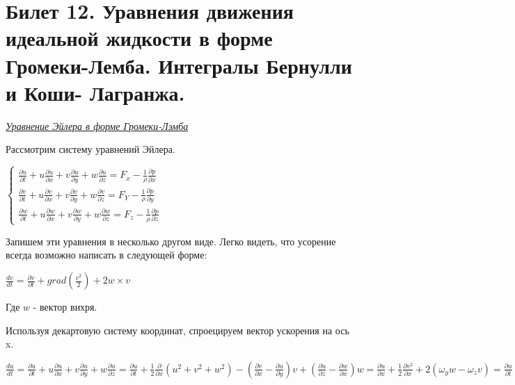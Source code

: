 \newpage
\section{Билет 12. Уравнения движения идеальной жидкости в форме Громеки-Лемба. Интегралы Бернулли и Коши- Лагранжа.}

\begin{center}
	\textit{\underline{Уравнение Эйлера в форме Громеки-Лэмба}}
\end{center}
Рассмотрим систему уравнений Эйлера.
\begin{center}
	$\begin{cases}
		\frac{\partial u}{\partial t} + u\frac{\partial u}{\partial x} + v\frac{\partial u}{\partial y} + w\frac{\partial u}{\partial z} = F_x - \frac{1}{\rho}\frac{\partial p}{\partial x}\\
		\frac{\partial v}{\partial t} + u\frac{\partial v}{\partial x} + v\frac{\partial v}{\partial y} + w\frac{\partial v}{\partial z} = F_Y - \frac{1}{\rho}\frac{\partial p}{\partial y}\\
		\frac{\partial w}{\partial t} + u\frac{\partial w}{\partial x} + v\frac{\partial w}{\partial y} + w\frac{\partial w}{\partial z} = F_z - \frac{1}{\rho}\frac{\partial p}{\partial z}
	\end{cases}$
\end{center}
Запишем эти уравнения в несколько другом виде. Легко видеть, что усорение всегда возможно написать в следующей форме:
\begin{center}
	$\frac{dv}{dt} = \frac{\partial v}{\partial t} + grad(\frac{v^2}{2}) + 2 w \times v$
\end{center}
Где $w$ - вектор вихря.

Используя декартовую систему координат, спроецируем вектор ускорения на ось x.
\begin{center}
	$\frac{du}{dt} = \frac{\partial u}{\partial t} + u \frac{\partial u}{\partial x} + v \frac{\partial u}{\partial y} + w \frac{\partial u}{\partial z} = \frac{\partial u}{\partial t} + \frac{1}{2}\frac{\partial}{\partial x}(u^2 + v^2 + w^2) - (\frac{\partial v}{\partial x} - \frac{\partial u}{\partial y}) v + (\frac{\partial u}{\partial z} - \frac{\partial w}{\partial x})w = \frac{\partial u}{\partial x} + \frac{1}{2}\frac{\partial v^2}{\partial x} + 2(\omega_yw - \omega_zv) = \frac{\partial u}{\partial t} + \frac{1}{2}\frac{\partial v^2}{\partial x} + 2(\omega \times v)_x$
\end{center}

